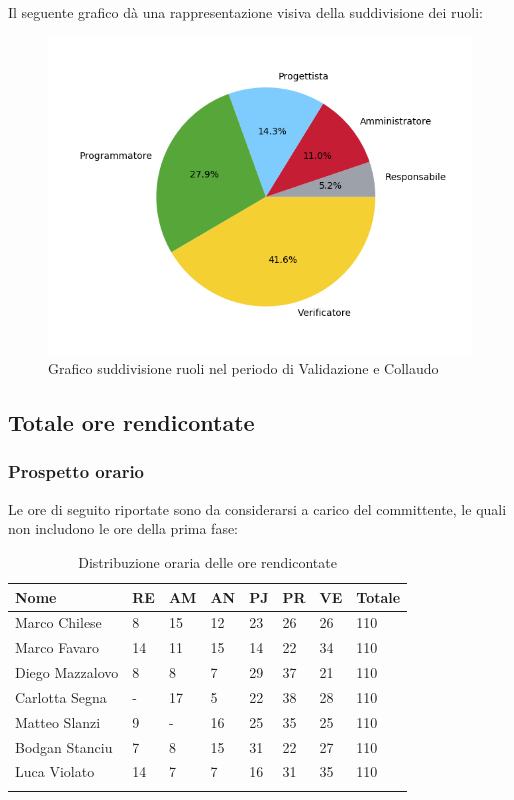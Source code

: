 Il seguente grafico dà una rappresentazione visiva della suddivisione dei ruoli:
\begin{figure}[H]
	\centering
	\includegraphics[width=1\linewidth]{./images/torta_vc.png}
	\caption{Grafico suddivisione ruoli nel periodo di Validazione e Collaudo}
	\label{fig:grafico suddivione ruoli periodo di Validazione e collaudo}
\end{figure}

\newpage

\subsection{Totale ore rendicontate}
\subsubsection{Prospetto orario}

Le ore di seguito riportate sono da considerarsi a carico del committente, le quali non includono le ore della prima fase:

\begin{longtable}{|C{.30\textwidth}|C{.06\textwidth}|C{.06\textwidth}|C{.06\textwidth} | C{.06\textwidth}| C{.06\textwidth} | C{.06\textwidth} | C{.10\textwidth} |}
\hline
\textbf{Nome} & \textbf{RE} & \textbf{AM} & \textbf{AN} & \textbf{PJ} & \textbf{PR} & \textbf{VE} & \textbf{Totale}\\
\hline 
Marco Chilese & 8 & 15 & 12 & 23 & 26 & 26 & 110\\
\hline
Marco Favaro & 14 & 11 & 15 & 14 & 22 & 34 & 110\\
\hline
Diego Mazzalovo & 8 & 8 & 7 & 29 & 37 & 21 & 110\\
\hline
Carlotta Segna & - & 17 & 5 & 22 & 38 & 28 & 110\\
\hline
Matteo Slanzi & 9 & - & 16 & 25 & 35 & 25 & 110\\
\hline
Bodgan Stanciu & 7 & 8 & 15 & 31 & 22 & 27 & 110\\
\hline
Luca Violato & 14 & 7 & 7 & 16 & 31 & 35 & 110 \\
\hline

\caption{Distribuzione oraria delle ore rendicontate}
\label{Distribuzione oraria delle ore rendicontate}
\end{longtable}

